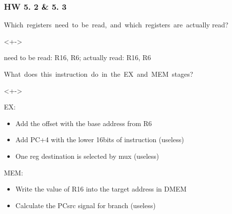 \documentclass[xcolor=table]{beamer}
\begin{document}
\begin{mdframe}%

\frametitle{HW 5. 2 \& 5. 3}\label{heading-sec-hw-5-2-5-3}%

\noindent{} Which  registers  need  to  be  read,  and  which  registers  are  actually read?%

\mdhr{}%

\begin{onlyenv}<+->%
\begin{mdbmargintb}{}{}%
\noindent{}need to be read: R16, R6; actually read: R16, R6%
\end{mdbmargintb}%
\end{onlyenv}%

 What  does  this  instruction  do  in  the  EX  and  MEM  stages?%

\mdhr{}%

\begin{onlyenv}<+->%

\noindent{}EX:%

\begin{itemize}[noitemsep,topsep=\mdcompacttopsep]%

\item{}Add the offset with the base address from R6%

\item{}Add PC+4 with the lower 16bits of instruction (useless)%

\item{}One reg destination is selected by mux (useless)%
\end{itemize}%

\noindent{}MEM:%

\begin{itemize}[noitemsep,topsep=\mdcompacttopsep]%

\item{}Write the value of R16 into the target address in DMEM%

\item{}Calculate the PCsrc signal for branch (useless)%
\end{itemize}%
\end{onlyenv}%
\end{mdframe}\label{sec-hw-5-2-5-3}%
\end{document}
